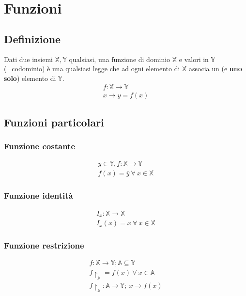 \chapter{Funzioni}
\section{Definizione}
Dati due insiemi $\mathbb{X},\mathbb{Y}$ qualsiasi, una funzione di dominio $\mathbb{X}$ e valori in $\mathbb{Y}$ (=codominio) è una qualsiasi legge che ad ogni elemento di $\mathbb{X}$ associa un (e \textbf{uno solo}) elemento di $\mathbb{Y}$.
\begin{equation}
\begin{gathered}
f: \mathbb{X} \rightarrow \mathbb{Y}\\
x \rightarrow y=f(x)
\end{gathered}
\end{equation}

\section{Funzioni particolari}
\subsection{Funzione costante}
\begin{equation*}
\begin{gathered}
\bar{y} \in \mathbb{Y}, f: \mathbb{X} \rightarrow \mathbb{Y}\\
f(x)=\bar{y}\ \forall\ x \in \mathbb{X}
\end{gathered}
\end{equation*}
\subsection{Funzione identità}
\begin{equation*}
\begin{gathered}
I_x: \mathbb{X} \rightarrow \mathbb{X}\\
I_x(x)=x\ \forall\ x \in \mathbb{X}
\end{gathered}
\end{equation*}
\subsection{Funzione restrizione}
\begin{equation*}
\begin{gathered}
f: \mathbb{X} \rightarrow \mathbb{Y}; \mathbb{A} \subseteq \mathbb{Y}\\
f\restriction_\mathbb{A} =f(x)\ \forall\ x \in \mathbb{A}\\
f\restriction_\mathbb{A}: \mathbb{A} \rightarrow \mathbb{Y};\ x \rightarrow f(x)
\end{gathered}
\end{equation*}

